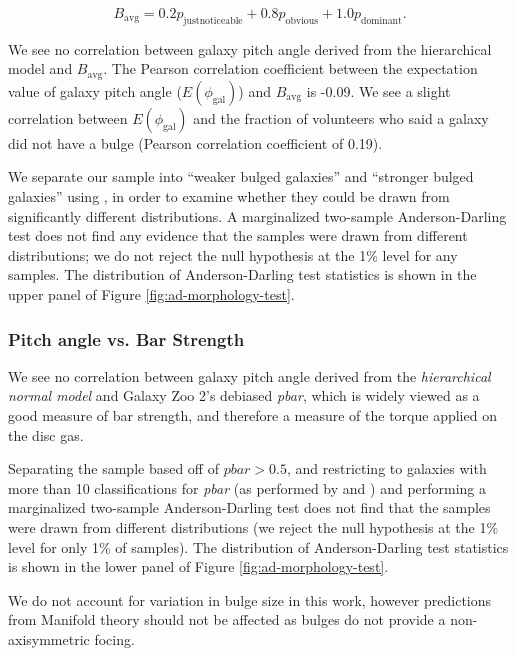 \begin{equation}
  B_\mathrm{avg} = 0.2p_\mathrm{just noticeable} + 0.8p_\mathrm{obvious} + 1.0p_\mathrm{dominant}.
\end{equation}

We see no correlation between galaxy pitch angle derived from the hierarchical model and $B_\mathrm{avg}$. The Pearson correlation coefficient between the expectation value of galaxy pitch angle ($E(\phi_\mathrm{gal})$) and $B_\mathrm{avg}$ is -0.09. We see a slight correlation between $E(\phi_\mathrm{gal})$ and the fraction of volunteers who said a galaxy did not have a bulge (Pearson correlation coefficient of 0.19).


We separate our sample into ``weaker bulged galaxies'' and ``stronger bulged galaxies'' using , in order to examine whether they could be drawn from significantly different distributions. A marginalized two-sample Anderson-Darling test does not find any evidence that the samples were drawn from different distributions; we do not reject the null hypothesis at the 1\% level for any samples. The distribution of Anderson-Darling test statistics is shown in the upper panel of Figure \ref{fig:ad-morphology-test}.


\subsubsection{Pitch angle vs. Bar Strength}
We see no correlation between galaxy pitch angle derived from the \textit{hierarchical normal model} and Galaxy Zoo 2's debiased \textit{pbar}, which is widely viewed as a good measure of bar strength, and therefore a measure of the torque applied on the disc gas.

Separating the sample based off of $\mathrm{\textit{pbar}} > 0.5$, and restricting to galaxies with more than 10 classifications for \textit{pbar} (as performed by \citealt{2011MNRAS.411.2026M} and \citealt{2017MNRAS.469.3363K}) and performing a marginalized two-sample Anderson-Darling test does not find that the samples were drawn from different distributions (we reject the null hypothesis at the 1\% level for only 1\% of samples). The distribution of Anderson-Darling test statistics is shown in the lower panel of Figure \ref{fig:ad-morphology-test}.

We do not account for variation in bulge size in this work, however predictions from Manifold theory should not be affected as bulges do not provide a non-axisymmetric focing.


